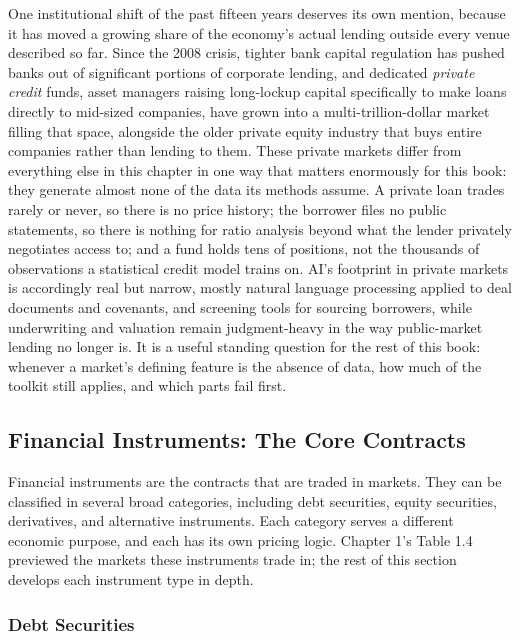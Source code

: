 \documentclass[../ai_in_finance]{subfiles}
\begin{document}
One institutional shift of the past fifteen years deserves its own mention, because it has moved a growing share of the economy's actual lending outside every venue described so far. Since the 2008 crisis, tighter bank capital regulation has pushed banks out of significant portions of corporate lending, and dedicated \emph{private credit} funds, asset managers raising long-lockup capital specifically to make loans directly to mid-sized companies, have grown into a multi-trillion-dollar market filling that space, alongside the older private equity industry that buys entire companies rather than lending to them. These private markets differ from everything else in this chapter in one way that matters enormously for this book: they generate almost none of the data its methods assume. A private loan trades rarely or never, so there is no price history; the borrower files no public statements, so there is nothing for ratio analysis beyond what the lender privately negotiates access to; and a fund holds tens of positions, not the thousands of observations a statistical credit model trains on. AI's footprint in private markets is accordingly real but narrow, mostly natural language processing applied to deal documents and covenants, and screening tools for sourcing borrowers, while underwriting and valuation remain judgment-heavy in the way public-market lending no longer is. It is a useful standing question for the rest of this book: whenever a market's defining feature is the absence of data, how much of the toolkit still applies, and which parts fail first.

\subsection{Financial Instruments: The Core Contracts}

Financial instruments are the contracts that are traded in markets. They can be classified in several broad categories, including debt securities, equity securities, derivatives, and alternative instruments. Each category serves a different economic purpose, and each has its own pricing logic. Chapter 1's Table 1.4 previewed the markets these instruments trade in; the rest of this section develops each instrument type in depth.

\subsubsection*{Debt Securities}
\end{document}
